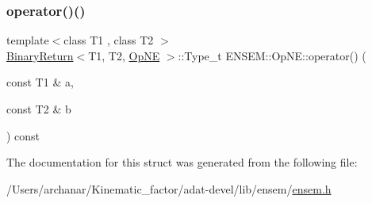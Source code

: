 \subsubsection{\texorpdfstring{operator()()}{operator()()}\hspace{0.1cm}{\footnotesize\ttfamily [3/3]}}
{\footnotesize\ttfamily template$<$class T1 , class T2 $>$ \\
\mbox{\hyperlink{structENSEM_1_1BinaryReturn}{Binary\+Return}}$<$T1, T2, \mbox{\hyperlink{structENSEM_1_1OpNE}{Op\+NE}} $>$\+::Type\+\_\+t E\+N\+S\+E\+M\+::\+Op\+N\+E\+::operator() (\begin{DoxyParamCaption}\item[{const T1 \&}]{a,  }\item[{const T2 \&}]{b }\end{DoxyParamCaption}) const\hspace{0.3cm}{\ttfamily [inline]}}



The documentation for this struct was generated from the following file\+:\begin{DoxyCompactItemize}
\item 
/\+Users/archanar/\+Kinematic\+\_\+factor/adat-\/devel/lib/ensem/\mbox{\hyperlink{adat-devel_2lib_2ensem_2ensem_8h}{ensem.\+h}}\end{DoxyCompactItemize}
